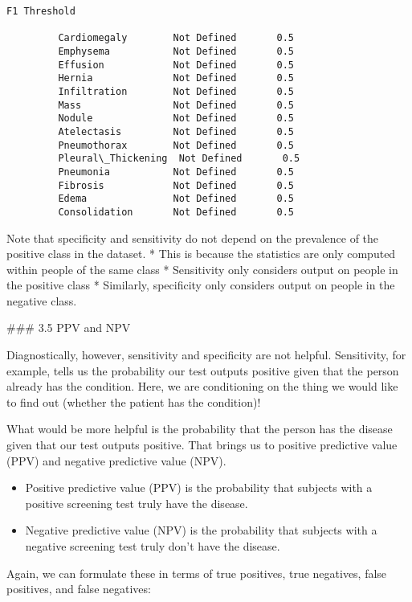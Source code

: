 \documentclass[11pt]{article}
\providecommand{\tightlist}{%
      \setlength{\itemsep}{0pt}\setlength{\parskip}{0pt}}
\begin{document}
\begin{Verbatim}[commandchars=\\\{\}]
                                      F1 Threshold  
                                                    
         Cardiomegaly        Not Defined       0.5  
         Emphysema           Not Defined       0.5  
         Effusion            Not Defined       0.5  
         Hernia              Not Defined       0.5  
         Infiltration        Not Defined       0.5  
         Mass                Not Defined       0.5  
         Nodule              Not Defined       0.5  
         Atelectasis         Not Defined       0.5  
         Pneumothorax        Not Defined       0.5  
         Pleural\_Thickening  Not Defined       0.5  
         Pneumonia           Not Defined       0.5  
         Fibrosis            Not Defined       0.5  
         Edema               Not Defined       0.5  
         Consolidation       Not Defined       0.5  
\end{Verbatim}
            
    Note that specificity and sensitivity do not depend on the prevalence of
the positive class in the dataset. * This is because the statistics are
only computed within people of the same class * Sensitivity only
considers output on people in the positive class * Similarly,
specificity only considers output on people in the negative class.

     \#\#\# 3.5 PPV and NPV

Diagnostically, however, sensitivity and specificity are not helpful.
Sensitivity, for example, tells us the probability our test outputs
positive given that the person already has the condition. Here, we are
conditioning on the thing we would like to find out (whether the patient
has the condition)!

What would be more helpful is the probability that the person has the
disease given that our test outputs positive. That brings us to positive
predictive value (PPV) and negative predictive value (NPV).

\begin{itemize}
\tightlist
\item
  Positive predictive value (PPV) is the probability that subjects with
  a positive screening test truly have the disease.
\item
  Negative predictive value (NPV) is the probability that subjects with
  a negative screening test truly don't have the disease.
\end{itemize}

Again, we can formulate these in terms of true positives, true
negatives, false positives, and false negatives:
\end{document}
